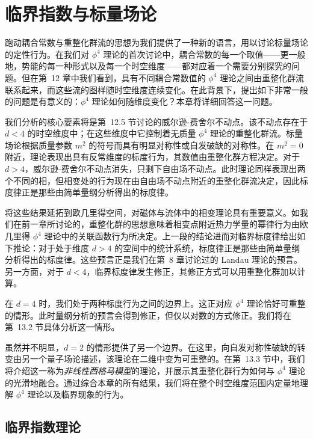 \chapter{临界指数与标量场论}

跑动耦合常数与重整化群流的思想为我们提供了一种新的语言，用以讨论标量场论的定性行为。在我们对 $\phi^4$ 理论的首次讨论中，耦合常数的每一个取值——更一般地，势能的每一种形式以及每一个时空维度——都对应着一个需要分别探究的问题。但在第~12 章中我们看到，具有不同耦合常数值的 $\phi^4$ 理论之间由重整化群流联系起来，而这些流的图样随时空维度连续变化。在此背景下，提出如下非常一般的问题是有意义的：$\phi^4$ 理论如何随维度变化？本章将详细回答这一问题。

我们分析的核心要素将是第~12.5 节讨论的威尔逊-费舍尔不动点。该不动点存在于 $d<4$ 的时空维度中；在这些维度中它控制着无质量 $\phi^4$ 理论的重整化群流。标量场论根据质量参数 $m^2$ 的符号而具有明显对称性或自发破缺的对称性。在 $m^2=0$ 附近，理论表现出具有反常维度的标度行为，其数值由重整化群方程决定。对于 $d>4$，威尔逊-费舍尔不动点消失，只剩下自由场不动点。此时理论同样表现出两个不同的相，但相变处的行为现在由自由场不动点附近的重整化群流决定，因此标度律正是那些由简单量纲分析得出的标度律。

将这些结果延拓到欧几里得空间，对磁体与流体中的相变理论具有重要意义。如我们在前一章所讨论的，重整化群的思想意味着相变点附近热力学量的幂律行为由欧几里得 $\phi^4$ 理论中的关联函数行为所决定。上一段的结论进而对临界标度律给出如下推论：对于处于维度 $d>4$ 的空间中的统计系统，标度律正是那些由简单量纲分析得出的标度律。这些预言正是我们在第~8 章讨论过的 Landau 理论的预言。另一方面，对于 $d<4$，临界标度律发生修正，其修正方式可以用重整化群加以计算。

在 $d=4$ 时，我们处于两种标度行为之间的边界上。这正对应 $\phi^4$ 理论恰好可重整的情形。此时量纲分析的预言会得到修正，但仅以对数的方式修正。我们将在第~13.2 节具体分析这一情形。

虽然并不明显，$d=2$ 的情形提供了另一个边界。在这里，向自发对称性破缺的转变由另一个量子场论描述，该理论在二维中变为可重整的。在第~13.3 节中，我们将介绍这一称为\emph{非线性西格马模型}的理论，并展示其重整化群行为如何与 $\phi^4$ 理论的光滑地融合。通过综合本章的所有结果，我们将在整个时空维度范围内定量地理解 $\phi^4$ 理论以及临界现象的行为。

\section{临界指数理论}

